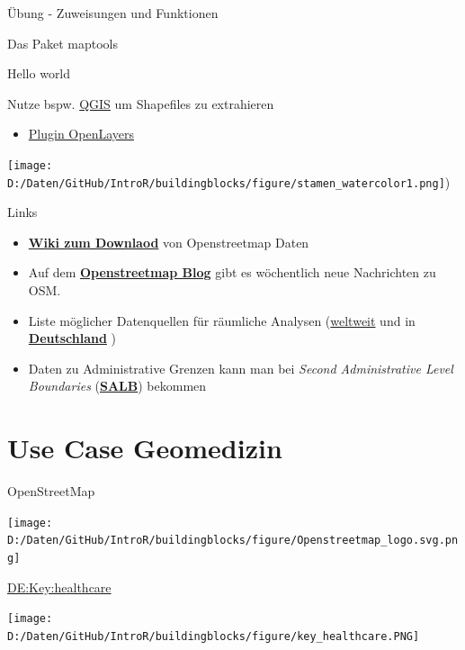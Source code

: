 \documentclass[ignorenonframetext,]{beamer}
\providecommand{\tightlist}{%
  \setlength{\itemsep}{0pt}\setlength{\parskip}{0pt}}
\begin{document}
\begin{frame}[fragile]{Übung - Zuweisungen und Funktionen}
\begin{frame}[fragile]{Das Paket maptools}
\begin{frame}[fragile]{Hello world}
\begin{frame}{Nutze bspw. \href{http://www.qgis.org/de/site/}{QGIS} um
Shapefiles zu extrahieren}
\begin{itemize}
\tightlist
\item
  \href{http://www.qgistutorials.com/de/docs/downloading_osm_data.html}{Plugin
  OpenLayers}
\end{itemize}

\texttt{[image: D:/Daten/GitHub/IntroR/buildingblocks/figure/stamen\_watercolor1.png]})

\end{frame}

\begin{frame}{Links}

\begin{itemize}
\item
  \href{http://wiki.openstreetmap.org/wiki/Downloading_data}{\textbf{Wiki
  zum Downlaod}} von Openstreetmap Daten
\item
  Auf dem \href{http://blog.openstreetmap.de/}{\textbf{Openstreetmap
  Blog}} gibt es wöchentlich neue Nachrichten zu OSM.
\item
  Liste möglicher Datenquellen für räumliche Analysen
  (\href{http://wiki.openstreetmap.org/wiki/Potential_Datasources}{weltweit}
  und in
  \href{http://wiki.openstreetmap.org/wiki/DE:Potential_Datasources}{\textbf{Deutschland}}
  )
\item
  Daten zu Administrative Grenzen kann man bei \emph{Second
  Administrative Level Boundaries}
  (\href{http://wiki.openstreetmap.org/wiki/SALB}{\textbf{SALB}})
  bekommen
\end{itemize}

\end{frame}

\section{Use Case Geomedizin}\label{use-case-geomedizin}

\begin{frame}{OpenStreetMap}

\texttt{[image: D:/Daten/GitHub/IntroR/buildingblocks/figure/Openstreetmap\_logo.svg.png]}

\end{frame}

\begin{frame}{\href{https://wiki.openstreetmap.org/wiki/DE:Key:healthcare}{DE:Key:healthcare}}

\texttt{[image: D:/Daten/GitHub/IntroR/buildingblocks/figure/key\_healthcare.PNG]}

\end{frame}


\end{frame}
\end{frame}
\end{frame}
\end{document}
